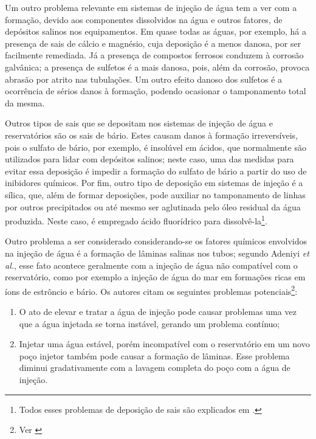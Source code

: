 Um outro problema relevante em sistemas de inje\c{c}\~{a}o de \'{a}gua tem a ver com a forma\c{c}\~{a}o, devido aos componentes dissolvidos na \'{a}gua e outros fatores, de dep\'{o}sitos salinos nos equipamentos. Em quase todas as \'{a}guas, por exemplo, h\'{a} a presen\c{c}a de sais de c\'{a}lcio e magn\'{e}sio, cuja deposi\c{c}\~{a}o \'{e} a menos danosa, por ser facilmente remediada. J\'{a} a presen\c{c}a de compostos ferrosos conduzem \`{a} corros\~{a}o galv\^{a}nica; a presen\c{c}a de sulfetos \'{e} a mais danosa, pois, al\'{e}m da corros\~{a}o, provoca abras\~{a}o por atrito nas tubula\c{c}\~{o}es. Um outro efeito danoso dos sulfetos \'{e} a ocorr\^{e}ncia de s\'{e}rios danos \`{a} forma\c{c}\~{a}o, podendo ocasionar o tamponamento total da mesma.

Outros tipos de sais que se depositam nos sistemas de inje\c{c}\~{a}o de \'{a}gua e reservat\'{o}rios s\~{a}o os sais de b\'{a}rio. Estes causam danos \`{a} forma\c{c}\~{a}o irrevers\'{i}veis, pois o sulfato de b\'{a}rio, por exemplo, \'{e} insol\'{u}vel em \'{a}cidos, que normalmente s\~{a}o utilizados para lidar com dep\'{o}sitos salinos; neste caso, uma das medidas para evitar essa deposi\c{c}\~{a}o \'{e} impedir a forma\c{c}\~{a}o do sulfato de b\'{a}rio a partir do uso de inibidores qu\'{i}micos. Por fim, outro tipo de deposi\c{c}\~{a}o em sistemas de inje\c{c}\~{a}o \'{e} a s\'{i}lica, que, al\'{e}m de formar deposi\c{c}\~{o}es, pode auxiliar no tamponamento de linhas por outros precipitados ou at\'{e} mesmo ser aglutinada pelo \'{o}leo residual da \'{a}gua produzida. Neste caso, \'{e} empregado \'{a}cido fluor\'{i}drico para dissolv\^{e}-la\footnote{Todos esses problemas de deposi\c{c}\~{a}o de sais s\~{a}o explicados em \cite[p. 664]{engres}.}.

Outro problema a ser considerado considerando-se os fatores qu\'{i}micos envolvidos na inje\c{c}\~{a}o de \'{a}gua \'{e} a forma\c{c}\~{a}o de l\^{a}minas salinas nos tubos; segundo Adeniyi \textit{et al.}, esse fato acontece geralmente com a inje\c{c}\~{a}o de \'{a}gua n\~{a}o compat\'{i}vel com o reservat\'{o}rio, como por exemplo a inje\c{c}\~{a}o de \'{a}gua do mar em forma\c{c}\~{o}es ricas em \'{i}ons de estr\^{o}ncio e b\'{a}rio. Os autores citam os seguintes problemas potenciais\footnote{Ver \cite{adeniyi2008}}:

\begin{enumerate}
	\item O ato de elevar e tratar a \'{a}gua de inje\c{c}\~{a}o pode causar problemas uma vez que a \'{a}gua injetada se torna inst\'{a}vel, gerando um problema cont\'{i}nuo;
	\item Injetar uma \'{a}gua est\'{a}vel, por\'{e}m incompat\'{i}vel com o reservat\'{o}rio em um novo po\c{c}o injetor tamb\'{e}m pode causar a forma\c{c}\~{a}o de l\^{a}minas. Esse problema diminui gradativamente com a lavagem completa do po\c{c}o com a \'{a}gua de inje\c{c}\~{a}o.
\end{enumerate}

